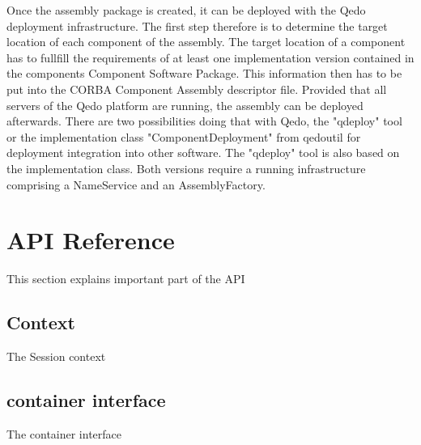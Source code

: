 \documentclass[12pt,a4paper]{report}
\begin{document}
Once the assembly package is created, it can be deployed with the Qedo deployment infrastructure. The first step therefore is to determine the target location of each component of the assembly. The target location of a component has to fullfill the requirements of at least one implementation version contained in the components Component Software Package. This information then has to be put into the CORBA Component Assembly descriptor file. Provided that all servers of the Qedo platform are running, the assembly can be deployed afterwards. There are two possibilities doing that with Qedo, the "qdeploy" tool or the implementation class "ComponentDeployment" from qedoutil for deployment integration into other software. The "qdeploy" tool is also based on the implementation class. Both versions require a running infrastructure comprising a NameService and an AssemblyFactory.  

\chapter{API Reference}
\label{sec:APIReference}

This section explains important part of the API

\section{Context}
\label{sec:Context}

The Session context


\section{container interface}
\label{sec:containerInterface}
The container interface
\end{document}

